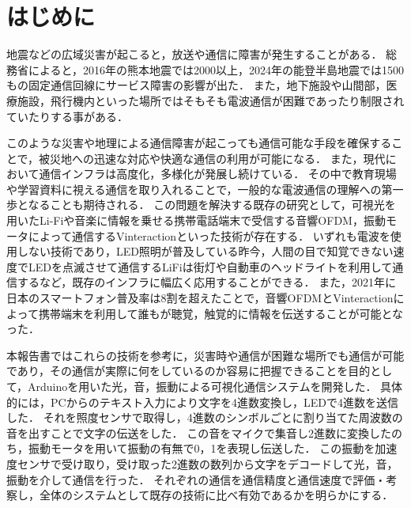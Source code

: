 \section{はじめに}
\label{intro}
地震などの広域災害が起こると，放送や通信に障害が発生することがある．
総務省によると，2016年の熊本地震では2000以上，2024年の能登半島地震では1500もの固定通信回線にサービス障害の影響が出た\cite{ref:quake1}\cite{ref:quake2}．
また，地下施設や山間部，医療施設，飛行機内といった場所ではそもそも電波通信が困難であったり制限されていたりする事がある．
\par
このような災害や地理による通信障害が起こっても通信可能な手段を確保することで，被災地への迅速な対応や快適な通信の利用が可能になる．
また，現代において通信インフラは高度化，多様化が発展し続けている．
その中で教育現場や学習資料に視える通信を取り入れることで，一般的な電波通信の理解への第一歩となることも期待される．
この問題を解決する既存の研究として，可視光を用いたLi-Fi\cite{ref:lifi}や音楽に情報を乗せる携帯電話端末で受信する音響OFDM\cite{ref:ofdm}，振動モータによって通信するVinteraction\cite{ref:vinteraction}といった技術が存在する．
いずれも電波を使用しない技術であり，LED照明が普及している昨今，人間の目で知覚できない速度でLEDを点滅させて通信するLiFiは街灯や自動車のヘッドライトを利用して通信するなど，既存のインフラに幅広く応用することができる．
また，2021年に日本のスマートフォン普及率は8割を超え\cite{ref:smartphone}たことで，音響OFDMとVinteractionによって携帯端末を利用して誰もが聴覚，触覚的に情報を伝送することが可能となった．
\par
本報告書ではこれらの技術を参考に，災害時や通信が困難な場所でも通信が可能であり，その通信が実際に何をしているのか容易に把握できることを目的として，Arduinoを用いた光，音，振動による可視化通信システムを開発した．
具体的には，PCからのテキスト入力により文字を4進数変換し，LEDで4進数を送信した．
それを照度センサで取得し，4進数のシンボルごとに割り当てた周波数の音を出すことで文字の伝送をした．
この音をマイクで集音し2進数に変換したのち，振動モータを用いて振動の有無で0，1を表現し伝送した．
この振動を加速度センサで受け取り，受け取った2進数の数列から文字をデコードして光，音，振動を介して通信を行った．
それぞれの通信を通信精度と通信速度で評価・考察し，全体のシステムとして既存の技術に比べ有効であるかを明らかにする．